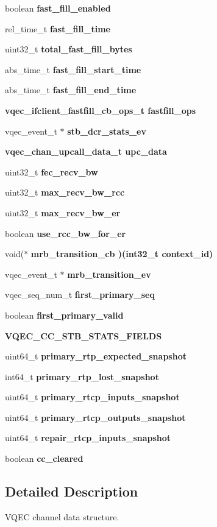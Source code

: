 \begin{CompactItemize}
\item 
boolean \bf{fast\_\-fill\_\-enabled}
\item 
rel\_\-time\_\-t \bf{fast\_\-fill\_\-time}
\item 
uint32\_\-t \bf{total\_\-fast\_\-fill\_\-bytes}
\item 
abs\_\-time\_\-t \bf{fast\_\-fill\_\-start\_\-time}
\item 
abs\_\-time\_\-t \bf{fast\_\-fill\_\-end\_\-time}
\item 
\bf{vqec\_\-ifclient\_\-fastfill\_\-cb\_\-ops\_\-t} \bf{fastfill\_\-ops}
\item 
vqec\_\-event\_\-t $\ast$ \bf{stb\_\-dcr\_\-stats\_\-ev}
\item 
\bf{vqec\_\-chan\_\-upcall\_\-data\_\-t} \bf{upc\_\-data}
\item 
uint32\_\-t \bf{fec\_\-recv\_\-bw}
\item 
uint32\_\-t \bf{max\_\-recv\_\-bw\_\-rcc}
\item 
uint32\_\-t \bf{max\_\-recv\_\-bw\_\-er}
\item 
boolean \bf{use\_\-rcc\_\-bw\_\-for\_\-er}
\item 
void($\ast$ \bf{mrb\_\-transition\_\-cb} )(int32\_\-t \bf{context\_\-id})
\item 
vqec\_\-event\_\-t $\ast$ \bf{mrb\_\-transition\_\-ev}
\item 
vqec\_\-seq\_\-num\_\-t \bf{first\_\-primary\_\-seq}
\item 
boolean \bf{first\_\-primary\_\-valid}
\item 
\bf{VQEC\_\-CC\_\-STB\_\-STATS\_\-FIELDS}
\item 
uint64\_\-t \bf{primary\_\-rtp\_\-expected\_\-snapshot}
\item 
int64\_\-t \bf{primary\_\-rtp\_\-lost\_\-snapshot}
\item 
uint64\_\-t \bf{primary\_\-rtcp\_\-inputs\_\-snapshot}
\item 
uint64\_\-t \bf{primary\_\-rtcp\_\-outputs\_\-snapshot}
\item 
uint64\_\-t \bf{repair\_\-rtcp\_\-inputs\_\-snapshot}
\item 
boolean \bf{cc\_\-cleared}
\end{CompactItemize}


\subsection{Detailed Description}
VQEC channel data structure. 



